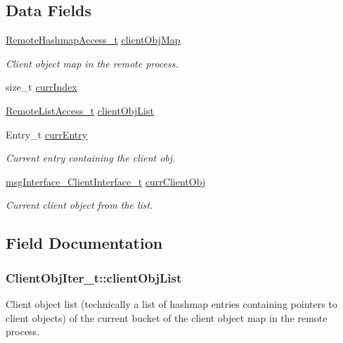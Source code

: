 \subsection*{Data Fields}
\begin{DoxyCompactItemize}
\item 
\hyperlink{struct_remote_hashmap_access__t}{Remote\+Hashmap\+Access\+\_\+t} \hyperlink{struct_client_obj_iter__t_af2d4d3810f8c40d694fc4732f34d6d7a}{client\+Obj\+Map}
\begin{DoxyCompactList}\small\item\em Client object map in the remote process. \end{DoxyCompactList}\item 
size\+\_\+t \hyperlink{struct_client_obj_iter__t_a9c17d7617c9eab63b8be48b9aa729fa9}{curr\+Index}
\item 
\hyperlink{struct_remote_list_access__t}{Remote\+List\+Access\+\_\+t} \hyperlink{struct_client_obj_iter__t_a2437d59934aff4d9b34a8af9faef53a0}{client\+Obj\+List}
\item 
Entry\+\_\+t \hyperlink{struct_client_obj_iter__t_a78557bc57c2c92271da77c158c92c000}{curr\+Entry}
\begin{DoxyCompactList}\small\item\em Current entry containing the client obj. \end{DoxyCompactList}\item 
\hyperlink{structmsg_interface___client_interface__t}{msg\+Interface\+\_\+\+Client\+Interface\+\_\+t} \hyperlink{struct_client_obj_iter__t_a1ba3a8464da6cebc18d79f68e6344c90}{curr\+Client\+Obj}
\begin{DoxyCompactList}\small\item\em Current client object from the list. \end{DoxyCompactList}\end{DoxyCompactItemize}


\subsection{Field Documentation}
\subsubsection[{\texorpdfstring{client\+Obj\+List}{clientObjList}}]{ Client\+Obj\+Iter\+\_\+t\+::client\+Obj\+List}\hypertarget{struct_client_obj_iter__t_a2437d59934aff4d9b34a8af9faef53a0}{}\label{struct_client_obj_iter__t_a2437d59934aff4d9b34a8af9faef53a0}
Client object list (technically a list of hashmap entries containing pointers to client objects) of the current bucket of the client object map in the remote process. 
